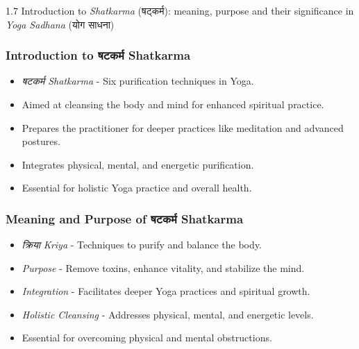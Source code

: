 \begin{frame}[fragile]\frametitle{}
\begin{center}
{\Large 1.7 Introduction to \textit{Shatkarma} (षट्कर्म): meaning, purpose and their significance in \textit{Yoga Sadhana} (योग साधना)}
\end{center}
\end{frame}


\begin{frame}[fragile]\frametitle{Introduction to षटकर्म  Shatkarma}

      \begin{itemize}
		\item \textit{षटकर्म  Shatkarma} - Six purification techniques in Yoga.
		\item Aimed at cleansing the body and mind for enhanced spiritual practice.
		\item Prepares the practitioner for deeper practices like meditation and advanced postures.
		\item Integrates physical, mental, and energetic purification.
		\item Essential for holistic Yoga practice and overall health.
	  \end{itemize}

\end{frame}

\begin{frame}[fragile]\frametitle{Meaning and Purpose of षटकर्म Shatkarma}

      \begin{itemize}
		\item \textit{क्रिया Kriya} - Techniques to purify and balance the body.
		\item \textit{Purpose} - Remove toxins, enhance vitality, and stabilize the mind.
		\item \textit{Integration} - Facilitates deeper Yoga practices and spiritual growth.
		\item \textit{Holistic Cleansing} - Addresses physical, mental, and energetic levels.
		\item Essential for overcoming physical and mental obstructions.
	  \end{itemize}

\end{frame}

